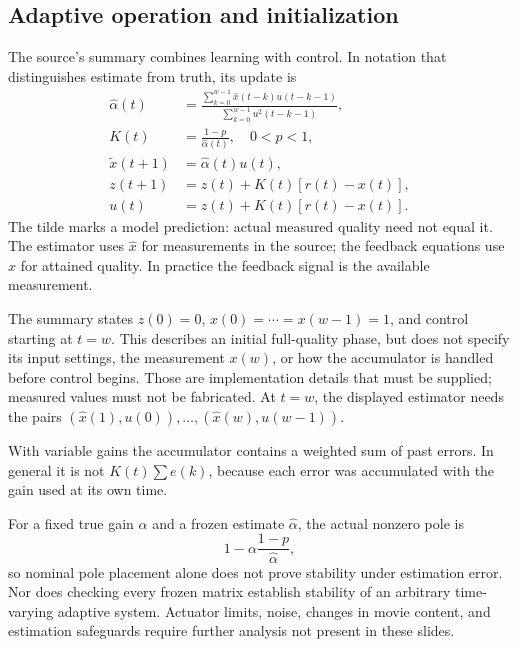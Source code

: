 \documentclass[11pt,a4paper]{article}
\numberwithin{equation}{section}
\numberwithin{figure}{section}
\numberwithin{table}{section}
\begin{document}
\subsection{Adaptive operation and initialization}
The source's summary combines learning with control. In notation that distinguishes estimate from truth, its update is
\begin{align}
\widehat\alpha(t)&=\frac{\sum_{k=0}^{w-1}\widehat{x}(t-k)u(t-k-1)}{\sum_{k=0}^{w-1}u^2(t-k-1)},\label{eq:adaptiveestimate}\\
K(t)&=\frac{1-p}{\widehat\alpha(t)},\quad 0<p<1,\\
\widetilde{x}(t+1)&=\widehat\alpha(t)u(t),\label{eq:prediction}\\
z(t+1)&=z(t)+K(t)[r(t)-x(t)],\\
u(t)&=z(t)+K(t)[r(t)-x(t)].\label{eq:adaptiveu}
\end{align}
The tilde marks a model prediction: actual measured quality need not equal it. The estimator uses $\widehat{x}$ for measurements in the source; the feedback equations use $x$ for attained quality. In practice the feedback signal is the available measurement.

The summary states $z(0)=0$, $x(0)=\cdots=x(w-1)=1$, and control starting at $t=w$. This describes an initial full-quality phase, but does not specify its input settings, the measurement $x(w)$, or how the accumulator is handled before control begins. Those are implementation details that must be supplied; measured values must not be fabricated. At $t=w$, the displayed estimator needs the pairs $(\widehat{x}(1),u(0)),\ldots,(\widehat{x}(w),u(w-1))$.

With variable gains the accumulator contains a weighted sum of past errors. In general it is not $K(t)\sum e(k)$, because each error was accumulated with the gain used at its own time.

For a fixed true gain $\alpha$ and a frozen estimate $\widehat\alpha$, the actual nonzero pole is
\[1-\alpha\frac{1-p}{\widehat\alpha},\]
so nominal pole placement alone does not prove stability under estimation error. Nor does checking every frozen matrix establish stability of an arbitrary time-varying adaptive system. Actuator limits, noise, changes in movie content, and estimation safeguards require further analysis not present in these slides.
\end{document}
